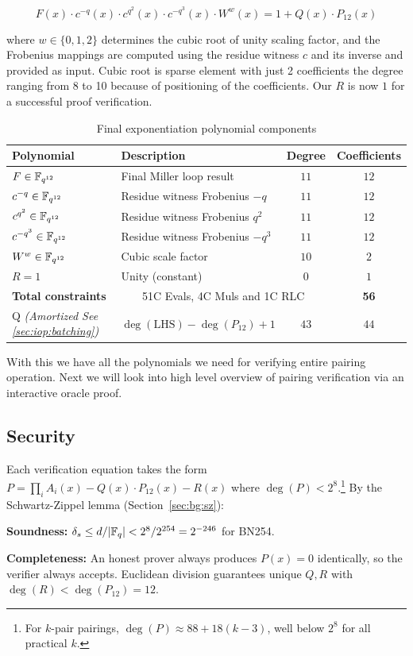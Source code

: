 \begin{equation}\label{eq:op:fx}
F(x) \cdot c^{-q}(x) \cdot c^{q^2}(x) \cdot c^{-q^3}(x) \cdot W^w(x) = 1 + Q(x) \cdot P_{12}(x)
\end{equation}

where $w \in \{0, 1, 2\}$ determines the cubic root of unity scaling factor, and the Frobenius mappings are computed using the residue witness $c$ and its inverse and provided as input. Cubic root is sparse element with just 2 coefficients the degree ranging from 8 to 10 because of positioning of the coefficients. Our $R$ is now $1$ for a successful proof verification.

\begin{table}[h]
\centering
\begin{tabular}{|l|l|c|c|}
\hline
\textbf{Polynomial} & \textbf{Description} & \textbf{Degree} & \textbf{Coefficients} \\
\hline
$F \in \mathbb{F}_{q^{12}}$ & Final Miller loop result & $11$ & $12$ \\
\hline
$c^{-q} \in \mathbb{F}_{q^{12}}$ & Residue witness Frobenius $-q$ & $11$ & $12$ \\
\hline
$c^{q^2} \in \mathbb{F}_{q^{12}}$ & Residue witness Frobenius $q^2$ & $11$ & $12$ \\
\hline
$c^{-q^3} \in \mathbb{F}_{q^{12}}$ & Residue witness Frobenius $-q^3$ & $11$ & $12$ \\
\hline
$W^w \in \mathbb{F}_{q^{12}}$ & Cubic scale factor & $10$ & $2$ \\
\hline
$R = 1$ & Unity (constant) & $0$ & $1$ \\
\hline
\textbf{Total constraints} & \multicolumn{2}{|c|}{51C Evals, 4C Muls and 1C RLC} & \textbf{56} \\
\hline
Q \textit{(Amortized See \ref{sec:iop:batching})} & $\deg(\text{LHS}) - \deg(P_{12}) + 1$ & $43$ & $44$ \\
\hline
\end{tabular}
\caption{Final exponentiation polynomial components}\label{tbl:op:finx}
\end{table}

With this we have all the polynomials we need for verifying entire pairing operation. Next we will look into high level overview of pairing verification via an interactive oracle proof.

\subsection{Security}\label{sec:op-sec}

Each verification equation takes the form $P = \prod_i A_i(x) - Q(x) \cdot P_{12}(x) - R(x)$ where $\deg(P) < 2^8$.\footnote{For $k$-pair pairings, $\deg(P) \approx 88 + 18(k-3)$, well below $2^8$ for all practical $k$.} By the Schwartz-Zippel lemma (Section~\ref{sec:bg:sz}):

\textbf{Soundness:} $\delta_s \leq d/|\mathbb{F}_q| < 2^8/2^{254} = 2^{-246}$ for BN254.

\textbf{Completeness:} An honest prover always produces $P(x) = 0$ identically, so the verifier always accepts. Euclidean division guarantees unique $Q, R$ with $\deg(R) < \deg(P_{12}) = 12$.
